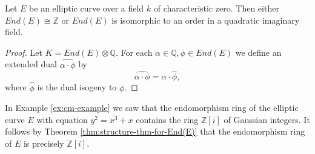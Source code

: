 \begin{thm}
  \label{thm:structure-thm-for-End(E)}
  Let $E$ be an elliptic curve over a field $k$ of characteristic zero.  Then either
  $End(E) \cong \mathbb{Z}$ or $End(E)$ is isomorphic to an order in a quadratic
  imaginary field.
\end{thm}
\begin{proof}
  Let $K = End(E) \otimes \mathbb{Q}$.  For each $\alpha \in \mathbb{Q}, \phi \in
  End(E)$ we define an extended dual $\widehat{\alpha \cdot \phi}$ by
  \begin{equation*}
    \widehat{\alpha \cdot \phi} = \alpha \cdot \hat{\phi},
  \end{equation*}
  where $\hat{\phi}$ is the dual isogeny to $\phi$.  
\end{proof}

In Example \ref{ex:cm-example} we saw that the endomorphism ring of the elliptic
curve $E$ with equation $y^{2} = x^{3} + x$ contains the ring $\mathbb{Z}[i]$ of
Gaussian integers.  It follows by Theorem \ref{thm:structure-thm-for-End(E)} that the
endomorphism ring of $E$ is precisely $\mathbb{Z}[i]$.

